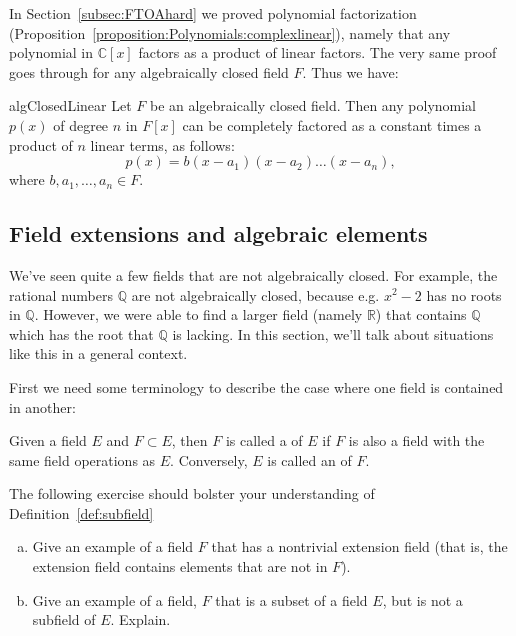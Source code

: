 In Section~\ref{subsec:FTOAhard} we proved polynomial factorization (Proposition~\ref{proposition:Polynomials:complexlinear}), namely that any polynomial in $\mathbb{C}[x]$ factors as a product of linear factors. The very same proof goes through for any algebraically closed field $F$.  Thus we have:

\begin{prop}{algClosedLinear}
Let $F$ be an algebraically closed field. Then any polynomial $p(x)$  of degree $n$ in $F[x]$ can be completely factored as a constant times a product of $n$ linear terms,   as follows:
\begin{equation}
p(x) = b(x -a_1)(x-a_2) \ldots (x - a_n),
\end{equation}
where $b,a_1,\ldots,a_n \in F$.
\end{prop}



\subsection{Field extensions and algebraic elements}
We've seen quite a few fields that are not algebraically closed. For example, the rational numbers $\mathbb{Q}$ are not algebraically closed, because e.g. $x^2 - 2$ has no  roots in $\mathbb{Q}$.  However, we were able to find a larger field (namely $\mathbb{R}$) that contains $\mathbb{Q}$ which has the root that $\mathbb{Q}$ is lacking. In this section, we'll talk about situations like this in a general context. 


First we need some  terminology to describe the case where one field is contained in  another:


\begin{defn}\label{def:subfield}  
Given a field $E$ and $F\subset E$, then $F$ is called a  of $E$ if $F$ is also a field with the same field operations as $E$. Conversely, $E$ is called an  of $F$.
 \end{defn}

The following exercise should  bolster your understanding of Definition~\ref{def:subfield}

\begin{exercise}{}
\begin{enumerate}[(a)]
\item
Give an example of a field $F$ that has a nontrivial extension field (that is, the extension field contains elements that are not in $F$).
\item
Give an example of a field, $F$ that is a subset of a field $E$, but is not a subfield of $E$. Explain.
\end{enumerate}
\end{exercise}

